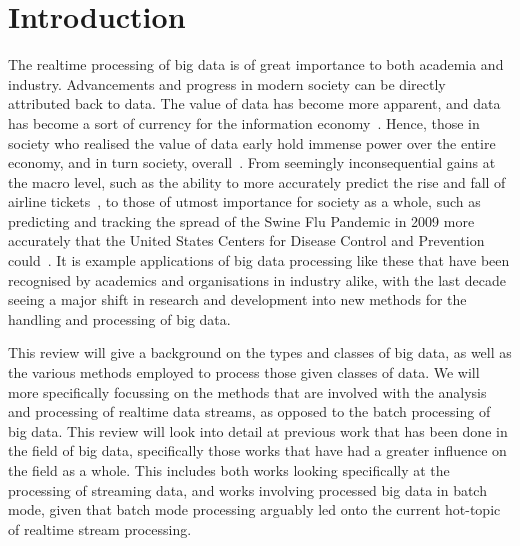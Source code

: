 \documentclass[a4paper,11pt]{article}
\begin{document}



\section{Introduction} %
\label{sec:introduction}

The realtime processing of big data is of great importance to both academia and industry. Advancements and progress in
modern society can be directly attributed back to data. The value of data has become more apparent, and data has become
a sort of currency for the information economy~\cite{st2009examining}. Hence, those in society who realised the value of
data early hold immense power over the entire economy, and in turn society, overall~\cite{lievesley1993increasing}.
From seemingly inconsequential gains at the macro level, such as the ability to more
accurately predict the rise and fall of airline tickets~\cite{darlin2006airfares}, to those of utmost importance for
society as a whole, such as predicting and tracking the spread of the Swine Flu Pandemic in 2009 more accurately that
the United States Centers for Disease Control and Prevention could~\cite{ritterman2009using,mayer2013big}. It is
example applications of big data processing like these that have been recognised by academics and organisations in
industry alike, with the last decade seeing a major shift in research and development into new methods for the handling
and processing of big data.

This review will give a background on the types and classes of big data, as well as the various methods employed to
process those given classes of data. We will more specifically focussing on the methods that are involved with the
analysis and processing of realtime data streams, as opposed to the batch processing of big data. This review will look
into detail at previous work that has been done in the field of big data, specifically those works that have had a
greater influence on the field  as a whole. This includes both works looking specifically at the processing of streaming
data, and works involving processed big data in batch mode, given that batch mode processing arguably led onto the
current hot-topic of realtime stream processing.
\end{document}
